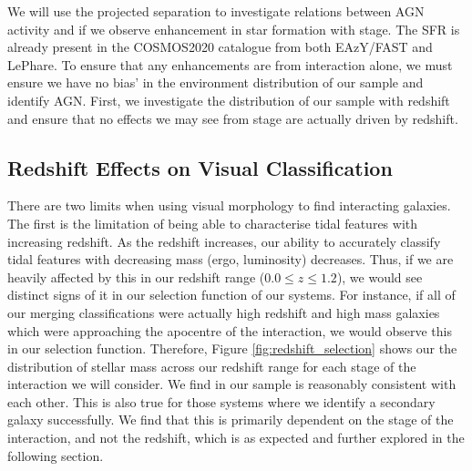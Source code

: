 We will use the projected separation to investigate relations between AGN activity and if we observe enhancement in star formation with stage. The SFR is already present in the COSMOS2020 catalogue from both EAzY/FAST and LePhare. To ensure that any enhancements are from interaction alone, we must ensure we have no bias' in the environment distribution of our sample and identify AGN. First, we investigate the distribution of our sample with redshift and ensure that no effects we may see from stage are actually driven by redshift.

\subsection{Redshift Effects on Visual Classification}
\noindent There are two limits when using visual morphology to find interacting galaxies. The first is the limitation of being able to characterise tidal features with increasing redshift. As the redshift increases, our ability to accurately classify tidal features with decreasing mass (ergo, luminosity) decreases. Thus, if we are heavily affected by this in our redshift range ($0.0 \leq z \leq 1.2$), we would see distinct signs of it in our selection function of our systems. For instance, if all of our merging classifications were actually high redshift and high mass galaxies which were approaching the apocentre of the interaction, we would observe this in our selection function. Therefore, Figure \ref{fig:redshift_selection} shows our the distribution of stellar mass across our redshift range for each stage of the interaction we will consider. We find in our sample is reasonably consistent with each other. This is also true for those systems where we identify a secondary galaxy successfully. We find that this is primarily dependent on the stage of the interaction, and not the redshift, which is as expected and further explored in the following section.

